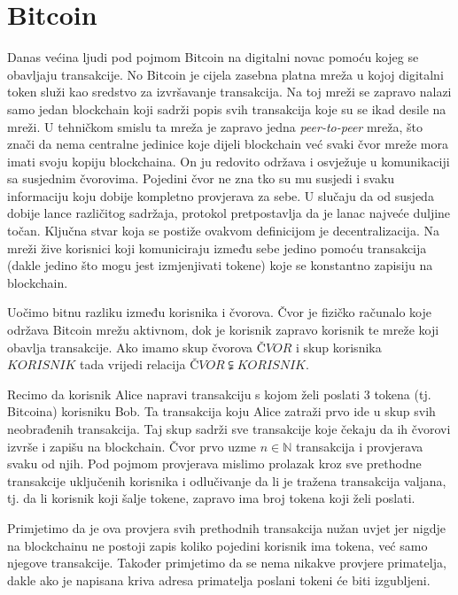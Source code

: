 \documentclass[a4paper,oneside,12pt]{memoir} %
\begin{document}
\section{Bitcoin}

Danas većina ljudi pod pojmom Bitcoin na digitalni novac pomoću kojeg se obavljaju transakcije. No Bitcoin je cijela zasebna platna mreža u kojoj digitalni token služi kao sredstvo za izvršavanje transakcija. Na toj mreži se zapravo nalazi samo jedan blockchain koji sadrži popis svih transakcija koje su se ikad desile na mreži. U tehničkom smislu ta mreža je zapravo jedna \textit{peer-to-peer} mreža, što znači da nema centralne jedinice koje dijeli blockchain već svaki čvor mreže mora imati svoju kopiju blockchaina. On ju redovito održava i osvježuje u komunikaciji sa susjednim čvorovima. Pojedini čvor ne zna tko su mu susjedi i svaku informaciju koju dobije kompletno provjerava za sebe. U slučaju da od susjeda dobije lance različitog sadržaja, protokol pretpostavlja da je lanac najveće duljine točan. Ključna stvar koja se postiže ovakvom definicijom je decentralizacija. Na mreži žive korisnici koji komuniciraju između sebe jedino pomoću transakcija (dakle jedino što mogu jest izmjenjivati tokene) koje se konstantno zapisiju na blockchain. 

\begin{napomena}
Uočimo bitnu razliku između korisnika i čvorova. Čvor je fizičko računalo koje održava Bitcoin mrežu aktivnom, dok je korisnik zapravo korisnik te mreže koji obavlja transakcije. Ako imamo skup čvorova $ČVOR$ i skup korisnika $KORISNIK$ tada vrijedi relacija $ČVOR \subsetneqq KORISNIK$.
\end{napomena}

Recimo da korisnik Alice napravi transakciju s kojom želi poslati 3 tokena (tj. Bitcoina) korisniku Bob. Ta transakcija koju Alice zatraži prvo ide u skup svih neobrađenih transakcija. Taj skup sadrži sve transakcije koje čekaju da ih čvorovi izvrše i zapišu na blockchain. Čvor prvo uzme $n \in \mathbb{N}$ transakcija i provjerava svaku od njih. Pod pojmom provjerava mislimo prolazak kroz sve prethodne transakcije uključenih korisnika i odlučivanje da li je tražena transakcija valjana, tj. da li korisnik koji šalje tokene, zapravo ima broj tokena koji želi poslati. 

\begin{napomena}
Primjetimo da je ova provjera svih prethodnih transakcija nužan uvjet jer nigdje na blockchainu ne postoji zapis koliko pojedini korisnik ima tokena, već samo njegove transakcije. Također primjetimo da se nema nikakve provjere primatelja, dakle ako je napisana kriva adresa primatelja poslani tokeni će biti izgubljeni.
\end{napomena}
\end{document}
